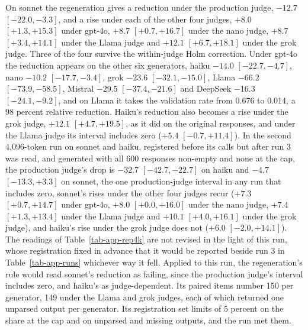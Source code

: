 On sonnet the regeneration gives a reduction under the production judge,
$-12.7$ $[-22.0, -3.3]$, and a rise under each of the other four judges,
$+8.0$ $[+1.3, +15.3]$ under gpt-4o, $+8.7$ $[+0.7, +16.7]$
under the nano judge, $+8.7$ $[+3.4, +14.1]$ under the Llama judge and $+12.1$
$[+6.7, +18.1]$ under the grok judge. Three of the four survive the
within-judge Holm correction.
Under gpt-4o the reduction appears on the other six generators, haiku $-14.0$
$[-22.7, -4.7]$, nano $-10.2$ $[-17.7, -3.4]$, grok $-23.6$ $[-32.1, -15.0]$,
Llama $-66.2$ $[-73.9, -58.5]$, Mistral $-29.5$ $[-37.4, -21.6]$ and DeepSeek
$-16.3$ $[-24.1, -9.2]$, and on Llama it takes the validation rate from 0.676
to 0.014, a 98 percent relative reduction.
Haiku's reduction also becomes a rise under the grok judge, $+12.1$
$[+4.7, +19.5]$, as it did on the original responses, and under the Llama judge
its interval includes zero ($+5.4$ $[-0.7, +11.4]$).
In the second 4,096-token run on sonnet and haiku, registered before its
calls but after run 3 was read, and generated with all 600 responses
non-empty and none at the cap, the production judge's drop is
$-32.7$ $[-42.7, -22.7]$ on haiku and $-4.7$ $[-13.3, +3.3]$ on sonnet, the
one production-judge interval in any run that includes zero, sonnet's rises
under the other four judges recur ($+7.3$ $[+0.7, +14.7]$ under gpt-4o,
$+8.0$ $[+0.0, +16.0]$ under the nano judge, $+7.4$ $[+1.3, +13.4]$ under the Llama
judge and $+10.1$ $[+4.0, +16.1]$ under the grok judge), and haiku's rise
under the grok judge does not ($+6.0$ $[-2.0, +14.1]$). The readings of
Table~\ref{tab-app-rep4k} are not revised in the light of this run, whose
registration fixed in advance that it would be reported beside run 3 in
Table~\ref{tab-app-runs} whichever way it fell. Applied to this run, the
regeneration's rule would read sonnet's reduction as failing, since the
production judge's interval includes zero, and haiku's as judge-dependent.
Its paired items number 150 per generator, 149 under the Llama and grok
judges, each of which returned one unparsed output per generator. Its
registration set limits of 5 percent on the share at the cap and on unparsed
and missing outputs, and the run met them.

